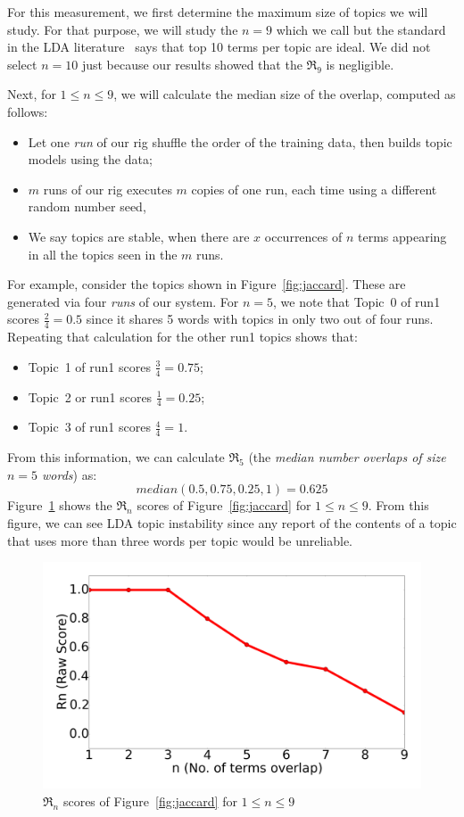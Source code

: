 \documentclass[10pt,conference]{IEEEtran}
\newcommand{\bi}{\begin{itemize}}
\newcommand{\ei}{\end{itemize}}
\theoremstyle{break}
\begin{document}
For this measurement, we first determine the maximum size of topics we will study. For that purpose,
we will study the $n=9$ which we call but the standard in the LDA literature~\cite{panichella2013effectively, lukins2010bug} says that top 10 terms per topic are ideal. We did not select $n=10$ just because our results showed that the $\Re_9$ is negligible.

Next, for $1 \le n \le 9$, we will calculate the median size of the overlap,
computed as follows:
\bi
\item Let one {\em run} of our rig shuffle the order of the training data, then builds topic models using the data;
  \item $m$ runs of our rig executes $m$ copies of one run, each time using a different random number seed,
\item We say topics are stable,
when there are $x$ occurrences of  $n$ terms appearing in all the topics seen in the $m$ runs.
\ei


For example, consider the topics shown in Figure~\ref{fig:jaccard}. These are generated via four {\em runs} of our system.
For $n=5$, we note that Topic~0 of run1 scores $\frac{2}{4}=0.5$ since it shares 5 words with topics in only two out of four runs.
Repeating that calculation for the other run1 topics shows that:
\bi
\item Topic~1 of run1 scores $\frac{3}{4}=0.75$;
\item Topic~2 or run1 scores $\frac{1}{4}=0.25$;
\item Topic~3 of run1 scores $\frac{4}{4}=1$.
  \ei
  From this information, we can calculate
  $\Re_5$  (the
  {\em median number overlaps of size $n=5$ words}) as:
  \[
   \mathit{median}(0.5, 0.75, 0.25, 1) =0.625\]
  Figure~\ref{fig:alln}
  shows the $\Re_n$ scores of 
  Figure~\ref{fig:jaccard} for $1 \le n \le 9$.  From this figure, we can see LDA topic instability
  since
  any report of the contents of a topic that uses more than three words per topic would be unreliable.

  \begin{figure}[!h]
  \includegraphics[width=\linewidth]{./fig/alln.png}
  \caption{$\Re_n$ scores of 
  Figure~\ref{fig:jaccard} for $1 \le n \le 9$}
  \label{fig:alln}
\end{figure}
\end{document}
